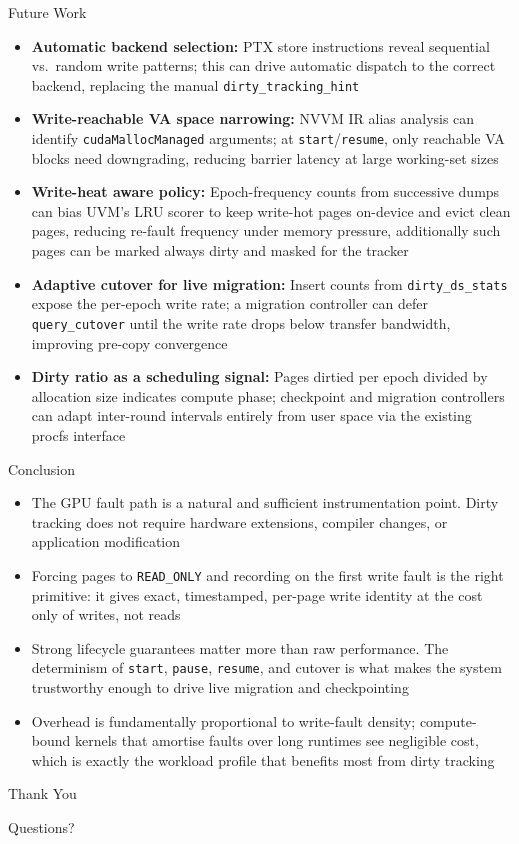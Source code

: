 \begin{frame}{Future Work}
\begin{itemize}[<+->]
    \item \textbf{Automatic backend selection:} PTX store instructions reveal sequential vs.\ random write patterns; this can drive automatic dispatch to the correct backend, replacing the manual \texttt{dirty\_tracking\_hint}
    \item \textbf{Write-reachable VA space narrowing:} NVVM IR alias analysis can identify \texttt{cudaMallocManaged} arguments; at \texttt{start}/\texttt{resume}, only reachable VA blocks need downgrading, reducing barrier latency at large working-set sizes
    \item \textbf{Write-heat aware policy:} Epoch-frequency counts from successive dumps can bias UVM's LRU scorer to keep write-hot pages on-device and evict clean pages, reducing re-fault frequency under memory pressure, additionally such pages can be marked always dirty and masked for the tracker
    \item \textbf{Adaptive cutover for live migration:} Insert counts from \texttt{dirty\_ds\_stats} expose the per-epoch write rate; a migration controller can defer \texttt{query\_cutover} until the write rate drops below transfer bandwidth, improving pre-copy convergence
    \item \textbf{Dirty ratio as a scheduling signal:} Pages dirtied per epoch divided by allocation size indicates compute phase; checkpoint and migration controllers can adapt inter-round intervals entirely from user space via the existing procfs interface
\end{itemize}
\end{frame}

\begin{frame}{Conclusion}
\begin{itemize}[<+->]
    \item The GPU fault path is a natural and sufficient instrumentation point. Dirty tracking does not require hardware extensions, compiler changes, or application modification
    \item Forcing pages to \texttt{READ\_ONLY} and recording on the first write fault is the right primitive: it gives exact, timestamped, per-page write identity at the cost only of writes, not reads
    \item Strong lifecycle guarantees matter more than raw performance. The determinism of \texttt{start}, \texttt{pause}, \texttt{resume}, and cutover is what makes the system trustworthy enough to drive live migration and checkpointing
    \item Overhead is fundamentally proportional to write-fault density; compute-bound kernels that amortise faults over long runtimes see negligible cost, which is exactly the workload profile that benefits most from dirty tracking
\end{itemize}
\end{frame}


\begin{frame}{Thank You}
\begin{center}
\Huge Questions?
\end{center}
\end{frame}
